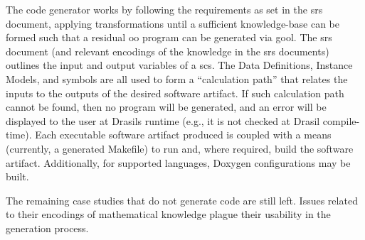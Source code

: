 The code generator works by following the requirements as set in the \acs{srs}
document, applying transformations until a sufficient knowledge-base can be
formed such that a residual \acs{oo} program can be generated via \acs{gool}.
The \acs{srs} document (and relevant encodings of the knowledge in the \acs{srs}
documents) outlines the input and output variables of a \acs{scs}. The Data
Definitions, Instance Models, and symbols are all used to form a
``calculation path'' that relates the inputs to the outputs of the desired
software artifact. If such calculation path cannot be found, then no program
will be generated, and an error will be displayed to the user at Drasils runtime
(e.g., it is not checked at Drasil compile-time). Each executable software
artifact produced is coupled with a means (currently, a generated Makefile) to
run and, where required, build the software artifact. Additionally, for
supported languages, Doxygen \cite{Doxygen} configurations may be built.

The remaining case studies that do not generate code are still left. Issues
related to their encodings of mathematical knowledge plague their usability in
the generation process.
